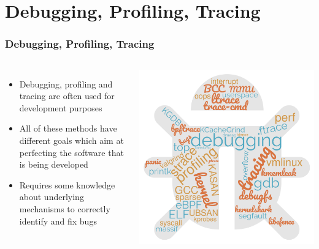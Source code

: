 \section{Debugging, Profiling, Tracing}

\begin{frame}
\frametitle{Debugging, Profiling, Tracing}
  \begin{columns}
    \begin{itemize}
      \item Debugging, profiling and tracing are often used for development purposes
      \item All of these methods have different goals which aim at perfecting the
            software that is being developed
      \item Requires some knowledge about underlying mechanisms to correctly identify
            and fix bugs
    \end{itemize}
    \vspace{0.5cm}
    \includegraphics[height=0.6\textheight]{slides/debugging-principles/cloud_word.png}
  \end{columns}
\end{frame}

